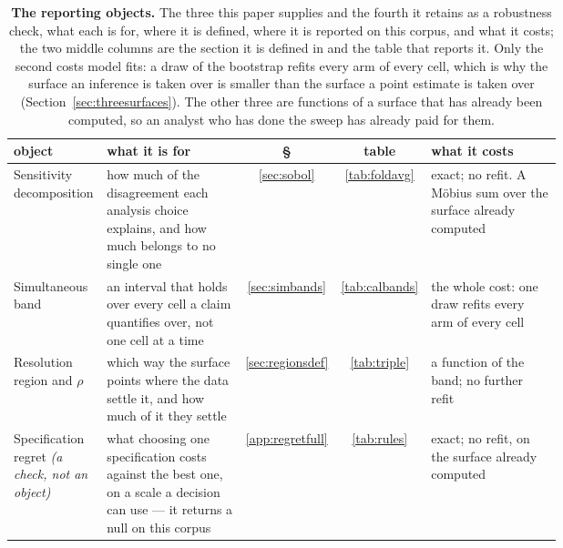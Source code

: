 \begin{table}[t]
\centering
\footnotesize
\setlength{\tabcolsep}{4pt}%
\renewcommand{\arraystretch}{1.2}%
\begin{tabular}{>{\raggedright\arraybackslash}p{0.17\linewidth}>{\raggedright\arraybackslash}p{0.27\linewidth}cc>{\raggedright\arraybackslash}p{0.26\linewidth}}
\toprule
object & what it is for & \S & table & what it costs \\
\midrule
Sensitivity decomposition & how much of the disagreement each analysis choice explains, and how much belongs to no single one & \ref{sec:sobol} & \ref{tab:foldavg} & exact; no refit. A M\"obius sum over the surface already computed \\
Simultaneous band & an interval that holds over every cell a claim quantifies over, not one cell at a time & \ref{sec:simbands} & \ref{tab:calbands} & the whole cost: one draw refits every arm of every cell \\
Resolution region and $\rho$ & which way the surface points where the data settle it, and how much of it they settle & \ref{sec:regionsdef} & \ref{tab:triple} & a function of the band; no further refit \\
Specification regret \emph{(a check, not an object)} & what choosing one specification costs against the best one, on a scale a decision can use --- it returns a null on this corpus & \ref{app:regretfull} & \ref{tab:rules} & exact; no refit, on the surface already computed \\
\bottomrule
\end{tabular}
\caption{\textbf{The reporting objects.} The three this paper supplies and the fourth it retains as a robustness check, what each is for, where it is defined, where it is reported on this corpus, and what it costs; the two middle columns are the section it is defined in and the table that reports it. Only the second costs model fits: a draw of the bootstrap refits every arm of every cell, which is why the surface an inference is taken over is smaller than the surface a point estimate is taken over (Section~\ref{sec:threesurfaces}). The other three are functions of a surface that has already been computed, so an analyst who has done the sweep has already paid for them.}
\label{tab:objects}
\end{table}
